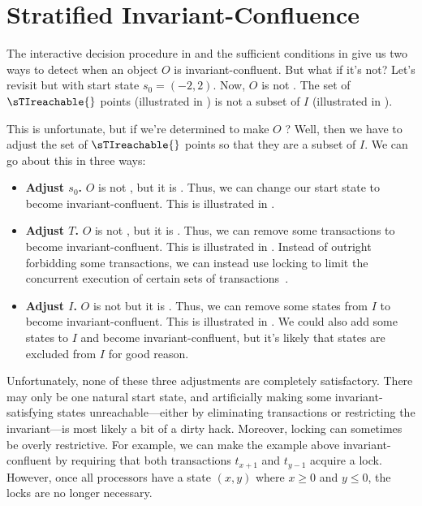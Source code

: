 \section{Stratified Invariant-Confluence}
The interactive decision procedure in 
and the sufficient conditions in  give us two
ways to detect when an object $O$ is invariant-confluent. But what if it's not?
%
Let's revisit  but with start state $s_0 =
(-2, 2)$. Now, $O$ is not \sTIconfluent{}. The set of $\sTIreachable{}$ points
(illustrated in ) is not a subset of $I$
(illustrated in ).

This is unfortunate, but if we're determined to make $O$ \sTIconfluent{}? Well,
then we have to adjust the set of $\sTIreachable{}$ points so that they are a
subset of $I$. We can go about this in three ways:
\begin{itemize}
  \item \textbf{Adjust $s_0$.}
    $O$ is not , but it is . Thus, we can change our start state to become
    invariant-confluent. This is illustrated in .

  \item \textbf{Adjust $T$.}
    $O$ is not , but it is
    . Thus, we can remove some transactions
    to become invariant-confluent. This is illustrated in
    . Instead of outright forbidding some
    transactions, we can instead use locking to limit the concurrent execution
    of certain sets of transactions~\cite{balegas2015putting,
    gotsman2016cause}.

  \item \textbf{Adjust $I$.}
    $O$ is not  but it is
    . Thus, we can
    remove some states from $I$ to become invariant-confluent. This is
    illustrated in . We could also add some states
    to $I$ and become invariant-confluent, but it's likely that states are
    excluded from $I$ for good reason.
\end{itemize}

{}

Unfortunately, none of these three adjustments are completely satisfactory.
There may only be one natural start state, and artificially making some
invariant-satisfying states unreachable---either by eliminating transactions or
restricting the invariant---is most likely a bit of a dirty hack. Moreover,
locking can sometimes be overly restrictive. For example, we can make the
example above invariant-confluent by requiring that both transactions $t_{x+1}$
and $t_{y-1}$ acquire a lock. However, once all processors have a state $(x,
y)$ where $x \geq 0$ and $y \leq 0$, the locks are no longer necessary.

